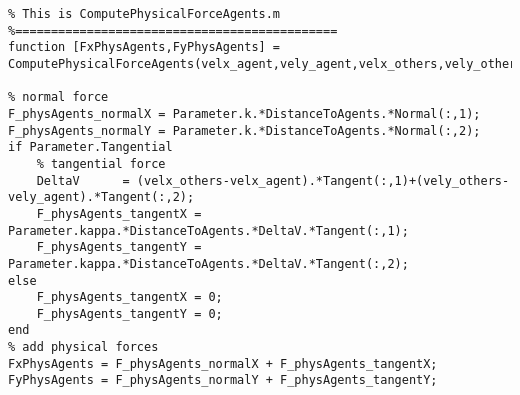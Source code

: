 \lstset{basicstyle=\footnotesize\ttfamily}
    
\begin{lstlisting}[breaklines]
%=============================================
% This is ComputePhysicalForceAgents.m
%=============================================
function [FxPhysAgents,FyPhysAgents] = ComputePhysicalForceAgents(velx_agent,vely_agent,velx_others,vely_others,Parameter,DistanceToAgents,Normal,Tangent)

% normal force
F_physAgents_normalX = Parameter.k.*DistanceToAgents.*Normal(:,1);
F_physAgents_normalY = Parameter.k.*DistanceToAgents.*Normal(:,2);
if Parameter.Tangential
    % tangential force
    DeltaV      = (velx_others-velx_agent).*Tangent(:,1)+(vely_others-vely_agent).*Tangent(:,2);
    F_physAgents_tangentX = Parameter.kappa.*DistanceToAgents.*DeltaV.*Tangent(:,1);
    F_physAgents_tangentY = Parameter.kappa.*DistanceToAgents.*DeltaV.*Tangent(:,2);
else
    F_physAgents_tangentX = 0;
    F_physAgents_tangentY = 0;
end
% add physical forces
FxPhysAgents = F_physAgents_normalX + F_physAgents_tangentX;
FyPhysAgents = F_physAgents_normalY + F_physAgents_tangentY;
\end{lstlisting}
    
